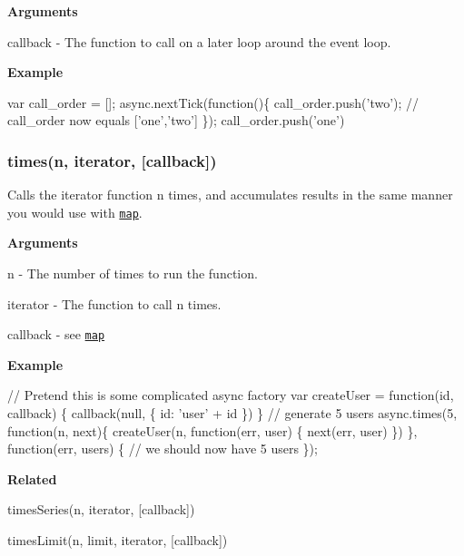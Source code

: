 {\bfseries Arguments}


\begin{DoxyItemize}
\item {\ttfamily callback} -\/ The function to call on a later loop around the event loop.
\end{DoxyItemize}

{\bfseries Example}


\begin{DoxyCode}
var call\_order = [];
async.nextTick(function()\{
    call\_order.push('two');
    // call\_order now equals ['one','two']
\});
call\_order.push('one')
\end{DoxyCode}


\label{_times}%
 \subsubsection*{times(n, iterator, \mbox{[}callback\mbox{]})}

Calls the {\ttfamily iterator} function {\ttfamily n} times, and accumulates results in the same manner you would use with \href{#map}{\tt {\ttfamily map}}.

{\bfseries Arguments}


\begin{DoxyItemize}
\item {\ttfamily n} -\/ The number of times to run the function.
\item {\ttfamily iterator} -\/ The function to call {\ttfamily n} times.
\item {\ttfamily callback} -\/ see \href{#map}{\tt {\ttfamily map}}
\end{DoxyItemize}

{\bfseries Example}


\begin{DoxyCode}
// Pretend this is some complicated async factory
var createUser = function(id, callback) \{
  callback(null, \{
    id: 'user' + id
  \})
\}
// generate 5 users
async.times(5, function(n, next)\{
    createUser(n, function(err, user) \{
      next(err, user)
    \})
\}, function(err, users) \{
  // we should now have 5 users
\});
\end{DoxyCode}


{\bfseries Related}


\begin{DoxyItemize}
\item times\+Series(n, iterator, \mbox{[}callback\mbox{]})
\item times\+Limit(n, limit, iterator, \mbox{[}callback\mbox{]})
\end{DoxyItemize}

